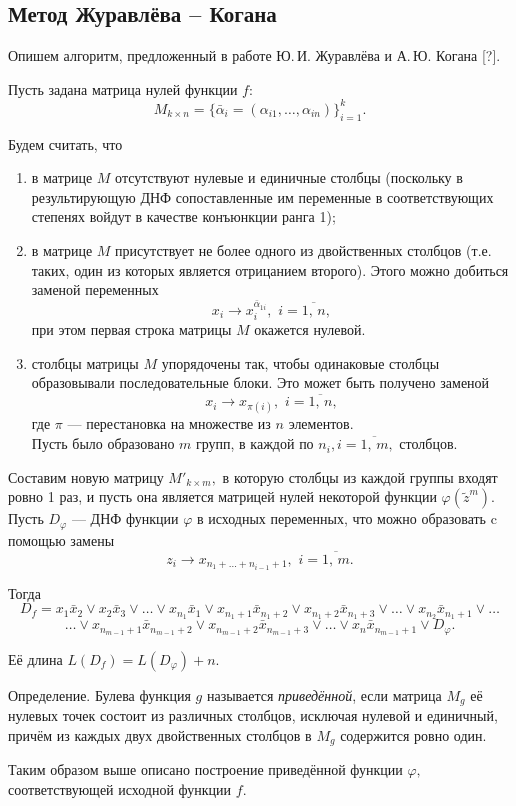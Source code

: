 \documentclass[12pt,a4paper,oneside,fleqn,leqno]{article}
\theoremstyle{definition}
\begin{document}
		\subsection{Метод Журавлёва -- Когана} \label{zhuravlev_kogan}
			Опишем алгоритм, предложенный в работе Ю.\,И. Журавлёва и А.\,Ю. Когана [?].\par
			Пусть задана матрица нулей функции $f:$
			$$
				M_{k \times n} = \{\bar{\alpha}_i = (\alpha_{i1},\ldots,\alpha_{in}) \}_{i = 1}^k.
			$$\par
			Будем считать, что
			\begin{enumerate}
				\item
				в матрице $M$ отсутствуют нулевые и единичные столбцы (поскольку в результирующую ДНФ сопоставленные им переменные в соответствующих степенях войдут в качестве конъюнкции ранга 1);
				\item
				в матрице $M$ присутствует не более одного из двойственных столбцов (т.е. таких, один из которых является отрицанием второго). Этого можно добиться заменой переменных
				$$
					x_i \rightarrow x_i^{\bar{\alpha}_{1i}},\,\,i = \overline{1,\,n},
				$$
				при этом первая строка матрицы $M$ окажется нулевой.
				\item
				столбцы матрицы $M$ упорядочены так, чтобы одинаковые столбцы образовывали последовательные блоки. Это может быть получено заменой
					$$
					x_i \rightarrow x_{\pi(i)},\,\,i = \overline{1,\,n},
				$$
				где $\pi$ --- перестановка на множестве из $n$ элементов.\\
				Пусть было образовано $m$ групп, в каждой по $n_i, i = \overline{1,\,m},$ столбцов.
			\end{enumerate}\par
			Составим новую матрицу $M'_{k \times m},$ в которую столбцы из каждой группы входят ровно 1 раз, и пусть она является матрицей нулей некоторой функции $\varphi(\tilde z^m).$ Пусть $D_{\varphi}$ --- ДНФ функции $\varphi$ в исходных переменных, что можно образовать c помощью замены
			$$
				z_i \rightarrow x_{n_1 + \ldots + n_{i - 1} + 1},\,\,i = \overline{1,\,m}.
			$$\par
			Тогда
			$$
				D_f = x_1\bar{x}_2 \vee x_2\bar{x}_3 \vee \ldots \vee x_{n_1}\bar{x}_1 \vee x_{n_1 + 1}\bar{x}_{n_1 + 2} \vee x_{n_1 + 2}\bar{x}_{n_1 + 3} \vee \ldots \vee x_{n_2}\bar{x}_{n_1 + 1} \vee \ldots
			$$
			$$
				\ldots \vee x_{n_{m - 1} + 1}\bar{x}_{n_{m - 1} + 2} \vee x_{n_{m - 1} + 2}\bar{x}_{n_{m - 1} + 3} \vee \ldots \vee x_{n}\bar{x}_{n_{m - 1} + 1} \vee D_{\varphi}.
			$$\par
			Её длина $L(D_f) = L(D_{\varphi}) + n.$\par
			Определение. Булева функция $g$ называется {\it приведённой}, если матрица $M_g$ её нулевых точек состоит из различных столбцов, исключая нулевой и единичный, причём из каждых двух двойственных столбцов в $M_g$ содержится ровно один.\par
			Таким образом выше описано построение приведённой функции $\varphi,$ соответствующей исходной функции $f.$
\end{document}
